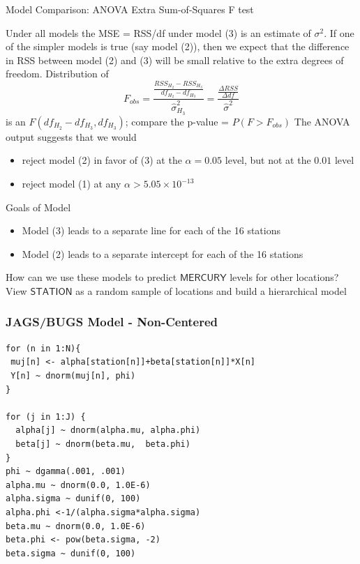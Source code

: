 \documentclass[]{beamer}
\def\M{\textsf{MERCURY}}
\def\S{\textsf{STATION}}
\begin{document}
\begin{frame}{Model Comparison: ANOVA Extra Sum-of-Squares F test}
    
Under all models the MSE = RSS/df under model (3) is an estimate of $\sigma^2$.
If one of the simpler models is true (say model (2)), then we expect that
the difference in RSS between model (2) and (3) will be small relative
to the extra degrees of freedom.
 \pause
Distribution of 
$$F_{obs} = \frac{\frac{RSS_{H_2} - RSS_{H_3}}{df_{H_2} -
    df_{H_3}}}{\hat{\sigma}^2_{H_3}} = \frac{\frac{ \Delta RSS}{\Delta
    df}}{\hat{\sigma}^2}$$
is an $F(df_{H_2} -   df_{H_3}, df_{H_3})$; compare the p-value = 
$P(F > F_{obs})$
 \pause
\vspace{.2in}
The ANOVA output suggests that we would 
\begin{itemize}
\item  reject model  (2) in favor of
(3) at the $\alpha = 0.05$ level, but not at the $0.01$ level  \pause
\item reject model (1) at any $\alpha > 5.05 \times 10^{-13}$
\end{itemize}
\end{frame}


\begin{frame}{Goals of Model}
  

  \begin{itemize}
  \item Model (3)  leads to a separate line for each of the 16
  stations 
 \pause
  \item Model (2) leads to a separate intercept for each of the 16 stations
  \end{itemize}
 \pause

How can we use these models to  predict $\M$ levels for other locations?
 \pause
\vspace{.2in}
View $\S$ as a random sample of locations and build a hierarchical
model \end{frame}

\begin{frame}[fragile]
\frametitle{JAGS/BUGS Model - Non-Centered}
\begin{verbatim}
for (n in 1:N){
 muj[n] <- alpha[station[n]]+beta[station[n]]*X[n]
 Y[n] ~ dnorm(muj[n], phi)
}

for (j in 1:J) {
  alpha[j] ~ dnorm(alpha.mu, alpha.phi)
  beta[j] ~ dnorm(beta.mu,  beta.phi)
}
phi ~ dgamma(.001, .001)
alpha.mu ~ dnorm(0.0, 1.0E-6)
alpha.sigma ~ dunif(0, 100)
alpha.phi <-1/(alpha.sigma*alpha.sigma)
beta.mu ~ dnorm(0.0, 1.0E-6)
beta.phi <- pow(beta.sigma, -2)
beta.sigma ~ dunif(0, 100)
\end{verbatim}
\end{frame}
\end{document}
